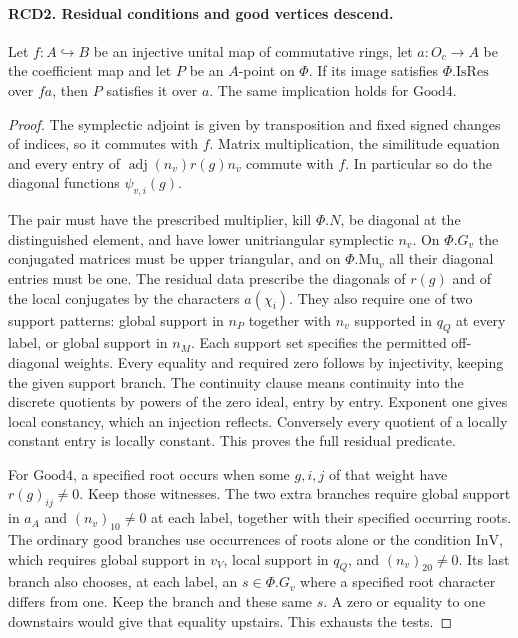 \paragraph{RCD2. Residual conditions and good vertices descend.}
Let $f:A\hookrightarrow B$ be an injective unital map of commutative
rings, let $a:O_c\to A$ be the coefficient map and let $P$ be an
$A$-point on $\Phi$. If its image satisfies $\Phi.\mathrm{IsRes}$
over $f a$, then $P$ satisfies it over $a$. The same implication holds
for $\mathrm{Good4}$.
\begin{proof}
The symplectic adjoint is given by transposition and fixed signed
changes of indices, so it commutes with $f$. Matrix multiplication,
the similitude equation and every entry of
$\operatorname{adj}(n_v)r(g)n_v$ commute with $f$. In particular so
do the diagonal functions $\psi_{v,i}(g)$.

The pair must have the prescribed multiplier, kill $\Phi.N$, be diagonal
at the distinguished element, and have lower unitriangular symplectic
$n_v$. On $\Phi.G_v$ the conjugated matrices must be upper triangular,
and on $\Phi.\mathrm{Mu}_v$ all their diagonal entries must be one.
The residual data prescribe the diagonals of $r(g)$ and of the local
conjugates by the characters $a(\chi_i)$. They also require one of
two support patterns: global support in $n_P$ together with $n_v$
supported in $q_Q$ at every label, or global support in $n_M$.
Each support set specifies the permitted off-diagonal weights.
Every equality and required zero follows by injectivity, keeping the
given support branch. The continuity clause means continuity into the
discrete quotients by powers of the zero ideal, entry by entry.
Exponent one gives local constancy, which an injection reflects.
Conversely every quotient of a locally constant entry is locally
constant. This proves the full residual predicate.

For $\mathrm{Good4}$, a specified root occurs when some $g,i,j$ of that
weight have $r(g)_{ij}\ne0$. Keep those witnesses. The two extra branches
require global support in $a_A$ and $(n_v)_{10}\ne0$ at each label,
together with their specified occurring roots. The ordinary good
branches use occurrences of roots alone or the condition $\mathrm{InV}$,
which requires global support in $v_V$, local support in $q_Q$, and
$(n_v)_{20}\ne0$. Its last branch also chooses, at each label, an
$s\in\Phi.G_v$ where a specified root character differs from one.
Keep the branch and these same $s$. A zero or equality to one
downstairs would give that equality upstairs. This exhausts the tests.
\end{proof}

